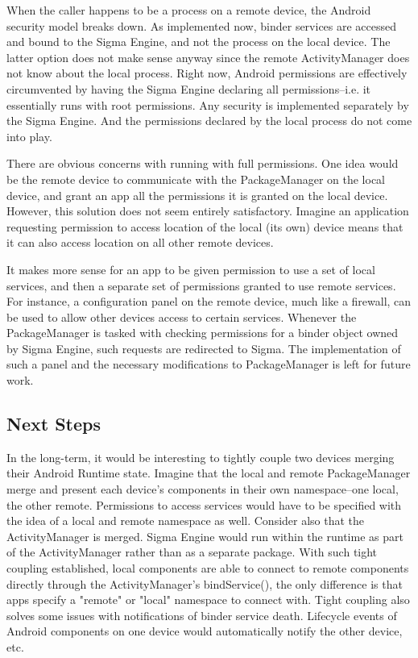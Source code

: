 \documentclass[prodmode]{acmlarge}
\begin{document}
When the caller happens to be a process on a remote device, the Android security model breaks down. As implemented now, binder services are accessed and bound to the Sigma Engine, and not the process on the local device. The latter option does not make sense anyway since the remote ActivityManager does not know about the local process. Right now, Android permissions are effectively circumvented by having the Sigma Engine declaring all permissions--i.e. it essentially runs with root permissions. Any security is implemented separately by the Sigma Engine. And the permissions declared by the local process do not come into play.

There are obvious concerns with running with full permissions. One idea would be the remote device to communicate with the PackageManager on the local device, and grant an app all the permissions it is granted on the local device. However, this solution does not seem entirely satisfactory. Imagine an application requesting permission to access location of the local (its own) device means that it can also access location on all other remote devices.

It makes more sense for an app to be given permission to use a set of local services, and then a separate set of permissions granted to use remote services. For instance, a configuration panel on the remote device, much like a firewall, can be used to allow other devices access to certain services. Whenever the PackageManager is tasked with checking permissions for a binder object owned by Sigma Engine, such requests are redirected to Sigma. The implementation of such a panel and the necessary modifications to PackageManager is left for future work.

\subsection{Next Steps}
In the long-term, it would be interesting to tightly couple two devices merging their Android Runtime state. Imagine that the local and remote PackageManager merge and present each device's components in their own namespace--one local, the other remote. Permissions to access services would have to be specified with the idea of a local and remote namespace as well. Consider also that the ActivityManager is merged. Sigma Engine would run within the runtime as part of the ActivityManager rather than as a separate package. With such tight coupling established, local components are able to connect to remote components directly through the ActivityManager's bindService(), the only difference is that apps specify a "remote" or "local" namespace to connect with. Tight coupling also solves some issues with notifications of binder service death. Lifecycle events of Android components on one device would automatically notify the other device, etc.
\end{document}
